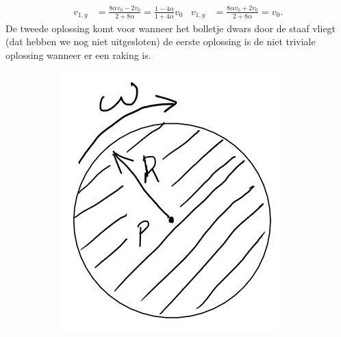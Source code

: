 \documentclass[11pt]{article}
\begin{document}
\begin{align}
	v_{1,y}&=\frac{8\alpha v_0-2v_0}{2+8\alpha}=\frac{1-4\alpha}{1+4\alpha}v_0&v_{1,y}&=\frac{8\alpha v_0+2v_0}{2+8\alpha}=v_0.
\end{align}
De tweede oplossing komt voor wanneer het bolletje dwars door de staaf vliegt (dat hebben we nog niet uitgesloten) de eerste oplossing is de niet triviale oplossing wanneer er een raking is.
\begin{figure}
	\centering
	\begin{subfigure}[b]{0.3\textwidth}
		\centering
		\includegraphics[width=\textwidth]{Schijf1}
		\caption{}
		\label{fig:Schijf1}
	\end{subfigure}
	\hfill
	\begin{subfigure}[b]{0.3\textwidth}
		\centering

\end{subfigure}
\end{figure}
\end{document}
